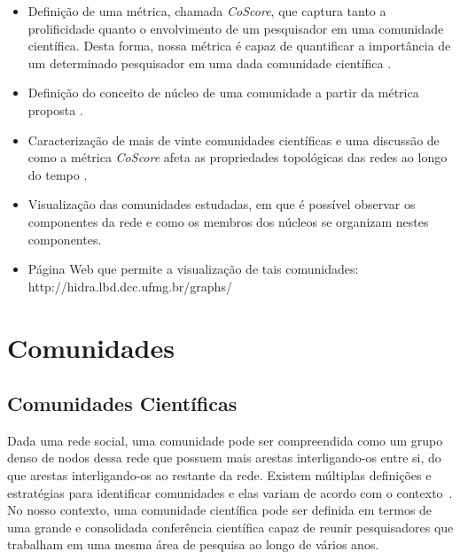 \documentclass[12pt]{article}
\begin{document}
\begin{itemize}
 \item Definição de uma métrica, chamada \textit{CoScore}, que captura tanto a prolificidade quanto o 
       envolvimento de um pesquisador em uma comunidade científica. Desta forma, nossa métrica é capaz 
       de quantificar a importância de um determinado pesquisador em uma dada comunidade científica \cite{Alves2013}.
 \item Definição do conceito de núcleo de uma comunidade a partir da métrica proposta \cite{Alves2013}.
 \item Caracterização de mais de vinte comunidades científicas e uma discussão de como a métrica \textit{CoScore} afeta 
       as propriedades topológicas das redes ao longo do tempo \cite{Alves2013}.
 \item Visualização das comunidades estudadas, em que é possível observar os componentes da rede e como os membros 
       dos núcleos se organizam nestes componentes.
 \item Página Web que permite a visualização de tais comunidades: http://hidra.lbd.dcc.ufmg.br/graphs/
 
\end{itemize}

\section{Comunidades}

\subsection{Comunidades Científicas}\label{sec:firstpage}

Dada uma rede social, uma comunidade pode ser compreendida como um grupo denso de nodos dessa rede que possuem mais arestas 
interligando-os entre si, do que arestas interligando-os ao restante da rede. Existem múltiplas definições e estratégias 
para identificar comunidades e elas variam de acordo com o contexto~\cite{Kleinberg2008,Leskovec2010}. No nosso contexto, 
uma comunidade científica pode ser definida em termos de uma grande e consolidada conferência científica capaz de reunir 
pesquisadores que trabalham em uma mesma área de pesquisa ao longo de vários anos.
\end{document}

